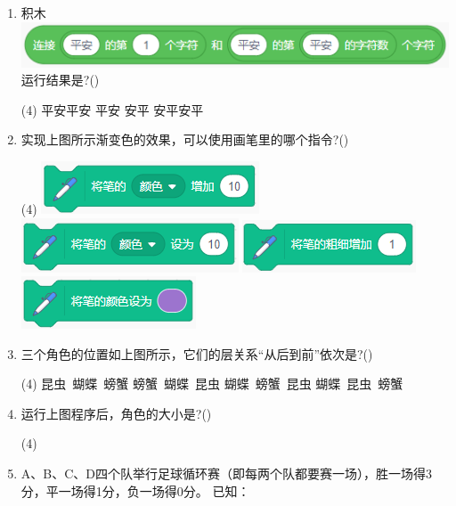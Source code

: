 \documentclass[10pt, a4paper]{article}
\begin{document}
\begin{enumerate}
        \item 积木\includegraphics[width=.4\textwidth]{18.png}运行结果是?(\qquad)
        \begin{tasks}(4)
            \task 平安平安
            \task 平安
            \task 安平
            \task 安平安平
        \end{tasks}

        \item 实现上图所示渐变色的效果，可以使用画笔里的哪个指令?(\qquad)
        \begin{tasks}(4)
            \task \includegraphics[width=.18\textwidth]{19a.png}
            \task \includegraphics[width=.18\textwidth]{19b.png}
            \task \includegraphics[width=.15\textwidth]{19c.png}
            \task \includegraphics[width=.15\textwidth]{19d.png}
        \end{tasks}

        \item 三个角色的位置如上图所示，它们的层关系“从后到前”依次是?(\qquad)
        \begin{tasks}(4)
            \task 昆虫\ 蝴蝶\ 螃蟹
            \task 螃蟹\ 蝴蝶\ 昆虫
            \task 蝴蝶\ 螃蟹\ 昆虫
            \task 蝴蝶\ 昆虫\ 螃蟹
        \end{tasks}

        \item 运行上图程序后，角色的大小是?(\qquad)
        \begin{tasks}(4)
        \end{tasks}

        \newpage
        \item 	A、B、C、D四个队举行足球循环赛（即每两个队都要赛一场），胜一场得3分，平一场得1分，负一场得0分。 已知： 
        

\end{enumerate}
\end{document}
